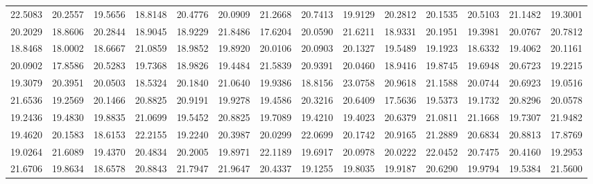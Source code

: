 \documentclass[12pt]{article}\usepackage[]{graphicx}\usepackage[]{color}
\begin{document}
\begin{landscape}
\begin{longtable}[t]{rrrrrrrrrrrrrr}
22.5083 & 20.2557 & 19.5656 & 18.8148 & 20.4776 & 20.0909 & 21.2668 & 20.7413 & 19.9129 & 20.2812 & 20.1535 & 20.5103 & 21.1482 & 19.3001\\
20.2029 & 18.8606 & 20.2844 & 18.9045 & 18.9229 & 21.8486 & 17.6204 & 20.0590 & 21.6211 & 18.9331 & 20.1951 & 19.3981 & 20.0767 & 20.7812\\
18.8468 & 18.0002 & 18.6667 & 21.0859 & 18.9852 & 19.8920 & 20.0106 & 20.0903 & 20.1327 & 19.5489 & 19.1923 & 18.6332 & 19.4062 & 20.1161\\
20.0902 & 17.8586 & 20.5283 & 19.7368 & 18.9826 & 19.4484 & 21.5839 & 20.9391 & 20.0460 & 18.9416 & 19.8745 & 19.6948 & 20.6723 & 19.2215\\
19.3079 & 20.3951 & 20.0503 & 18.5324 & 20.1840 & 21.0640 & 19.9386 & 18.8156 & 23.0758 & 20.9618 & 21.1588 & 20.0744 & 20.6923 & 19.0516\\
21.6536 & 19.2569 & 20.1466 & 20.8825 & 20.9191 & 19.9278 & 19.4586 & 20.3216 & 20.6409 & 17.5636 & 19.5373 & 19.1732 & 20.8296 & 20.0578\\
19.2436 & 19.4830 & 19.8835 & 21.0699 & 19.5452 & 20.8825 & 19.7089 & 19.4210 & 19.4023 & 20.6379 & 21.0811 & 21.1668 & 19.7307 & 21.9482\\
19.4620 & 20.1583 & 18.6153 & 22.2155 & 19.2240 & 20.3987 & 20.0299 & 22.0699 & 20.1742 & 20.9165 & 21.2889 & 20.6834 & 20.8813 & 17.8769\\
19.0264 & 21.6089 & 19.4370 & 20.4834 & 20.2005 & 19.8971 & 22.1189 & 19.6917 & 20.0978 & 20.0222 & 22.0452 & 20.7475 & 20.4160 & 19.2953\\
21.6706 & 19.8634 & 18.6578 & 20.8843 & 21.7947 & 21.9647 & 20.4337 & 19.1255 & 19.8035 & 19.9187 & 20.6290 & 19.9794 & 19.5384 & 21.5600\\*
\end{longtable}
\end{landscape}
\endgroup{}
\end{document}
